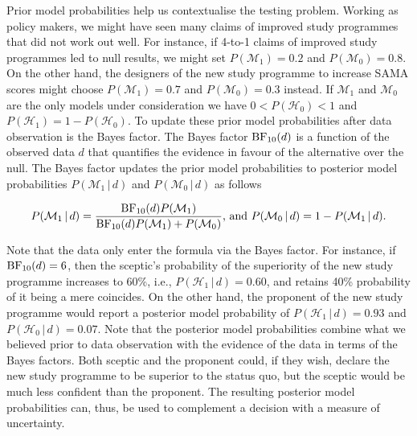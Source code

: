\documentclass[english,,doc,floatsintext]{apa6}
\begin{document}
Prior model probabilities help us contextualise the testing problem. Working as policy makers, we might have seen many claims of improved study programmes that did not work out well. For instance, if 4-to-1 claims of improved study programmes led to null results, we might set \(P( \mathcal{M}_{1}) = 0.2\) and \(P(\mathcal{M}_{0}) = 0.8\). On the other hand, the designers of the new study programme to increase SAMA scores might choose \(P( \mathcal{M}_{1}) = 0.7\) and \(P(\mathcal{M}_{0}) = 0.3\) instead. If \(\mathcal{M}_{1}\) and \(\mathcal{M}_{0}\) are the only models under consideration we have \(0 < P( \mathcal{H}_{0}) < 1\) and \(P( \mathcal{H}_{1})= 1 - P( \mathcal{H}_{0})\). To update these prior model probabilities after data observation is the Bayes factor. The Bayes factor \(\textnormal{BF}_{10}(d)\) is a function of the observed data \(d\) that quantifies the evidence in favour of the alternative over the null. The Bayes factor updates the prior model probabilities to posterior model probabilities \(P(\mathcal{M}_{1} \, | \, d)\) and \(P(\mathcal{M}_{0} \, | \, d)\) as follows

\begin{align}
\label{eqPriorToPosterior}
P(\mathcal{M}_{1} \, | \, d) = \frac{ \textnormal{BF}_{10}(d) P(\mathcal{M}_{1})}{\textnormal{BF}_{10}(d) P(\mathcal{M}_{1}) + P(\mathcal{M}_{0})} \text{, and } P(\mathcal{M}_{0} \, | \, d) = 1 - P(\mathcal{M}_{1} \, | \, d). 
\end{align}

Note that the data only enter the formula via the Bayes factor. For instance, if \(\textnormal{BF}_{10}(d) = 6\), then the sceptic's probability of the superiority of the new study programme increases to 60\%, i.e., \(P(\mathcal{H}_{1} \, | \, d)=0.60\), and retains 40\% probability of it being a mere coincides. On the other hand, the proponent of the new study programme would report a posterior model probability of \(P(\mathcal{H}_{1} \, | \, d)=0.93\) and \(P(\mathcal{H}_{0} \, | \, d)=0.07\). Note that the posterior model probabilities combine what we believed prior to data observation with the evidence of the data in terms of the Bayes factors. Both sceptic and the proponent could, if they wish, declare the new study programme to be superior to the status quo, but the sceptic would be much less confident than the proponent. The resulting posterior model probabilities can, thus, be used to complement a decision with a measure of uncertainty.
\end{document}
